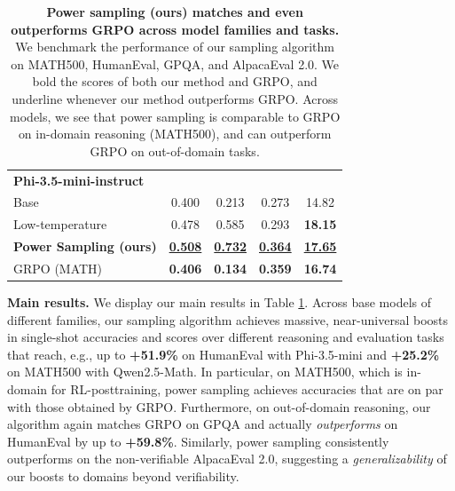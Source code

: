 \documentclass{article}
\renewcommand{\paragraph}[1]{\vspace{.1em}\noindent\textbf{#1}}
\begin{document}
\begin{table}[t]
\begin{tabular}{p{4cm}cccc}
\multicolumn{5}{l}{\textbf{Phi-3.5-mini-instruct}} \\
\hspace{0.5cm}Base     & 0.400     &     0.213 &   0.273   &   14.82   \\
\hspace{0.5cm}Low-temperature & 0.478     &    0.585  &   0.293   &  \textbf{18.15}    \\
\hspace{0.5cm}\textbf{Power Sampling (ours)}     &  \underline{\textbf{0.508}}    &     \underline{\textbf{0.732}} &   \underline{\textbf{{0.364}}}  &  \underline{\textbf{17.65}}    \\
\cmidrule[\lightrulewidth](lr){1-5}
\hspace{0.5cm}GRPO (MATH)   & \textbf{0.406}      &   \textbf{0.134}   &   \textbf{0.359}   &   \textbf{{16.74}}   \\
\bottomrule
\end{tabular}
\vspace{5pt}
\caption{\textbf{Power sampling (ours) matches and even outperforms GRPO across model families and tasks.}  We benchmark the performance of our sampling algorithm on MATH500, HumanEval, GPQA, and AlpacaEval 2.0. We bold the scores of both our method and GRPO, and underline whenever our method outperforms GRPO. Across models, we see that power sampling is comparable to GRPO on in-domain reasoning (MATH500), and can outperform GRPO on out-of-domain tasks.}\label{tab:main}
\vspace{-5pt}
\end{table}






\paragraph{Main results.} We display our main results in Table \ref{tab:main}. Across base models of different families, our sampling algorithm achieves massive, near-universal boosts in single-shot accuracies and scores over different reasoning and evaluation tasks that reach, e.g., up to \textbf{+51.9\%} on HumanEval with Phi-3.5-mini and \textbf{+25.2\%} on MATH500 with Qwen2.5-Math. In particular, on MATH500, which is in-domain for RL-posttraining, power sampling achieves accuracies that are on par with those obtained by GRPO. Furthermore, on out-of-domain reasoning, our algorithm again matches GRPO on GPQA and actually \textit{outperforms} on HumanEval by up to \textbf{+59.8\%}. Similarly, power sampling consistently outperforms on the non-verifiable AlpacaEval 2.0, suggesting a \textit{generalizability} of our boosts to domains beyond verifiability. 
\end{document}
